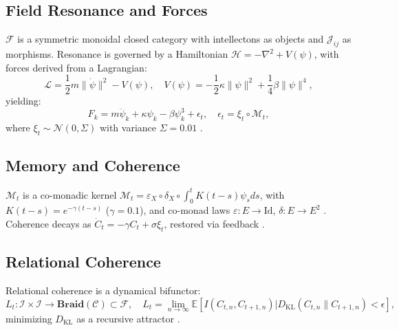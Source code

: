 \documentclass[11pt]{article}
\newcommand{\field}[1]{\mathcal{#1}}
\newcommand{\intellecton}{\mathcal{I}}
\newcommand{\expect}{\mathbb{E}}
\newcommand{\dkl}{D_{\text{KL}}}
\newcommand{\cat}[1]{\mathbf{#1}}
\begin{document}
\subsection{Field Resonance and Forces}
$\field{F}$ is a symmetric monoidal closed category with intellectons as objects and $\mathcal{J}_{ij}$ as morphisms. Resonance is governed by a Hamiltonian $\mathcal{H} = -\nabla^2 + V(\psi)$, with forces derived from a Lagrangian:
\begin{equation}
\mathcal{L} = \frac{1}{2} m \|\dot{\psi}\|^2 - V(\psi), \quad V(\psi) = -\frac{1}{2} \kappa \|\psi\|^2 + \frac{1}{4} \beta \|\psi\|^4,
\label{eq:lagrangian}
\end{equation}
yielding:
\begin{equation}
F_k = m \ddot{\psi}_k + \kappa \psi_k - \beta \psi_k^3 + \epsilon_t, \quad \epsilon_t = \xi_t \circ \mathcal{M}_t,
\label{eq:force}
\end{equation}
where $\xi_t \sim \mathcal{N}(0, \Sigma)$ with variance $\Sigma = 0.01$ \citep{susskind2023}.

\subsection{Memory and Coherence}
$\mathcal{M}_t$ is a co-monadic kernel $\mathcal{M}_t = \varepsilon_X \circ \delta_X \circ \int_0^t K(t-s) \psi_s ds$, with $K(t-s) = e^{-\gamma (t-s)}$ ($\gamma = 0.1$), and co-monad laws $\varepsilon: E \to \text{Id}$, $\delta: E \to E^2$ \citep{sheldrake2023}. Coherence decays as $\dot{C}_t = -\gamma C_t + \sigma \xi_t$, restored via feedback \citep{friston2024}.

\subsection{Relational Coherence}
Relational coherence is a dynamical bifunctor:
\begin{equation}
L_t: \intellecton \times \intellecton \to \cat{Braid}(\field{C}) \subset \field{F}, \quad L_t = \lim_{n \to \infty} \expect[I(C_{t,n}, C_{t+1,n}) | \dkl(C_{t,n} \| C_{t+1,n}) < \epsilon],
\label{eq:relational_coherence}
\end{equation}
minimizing $\dkl$ as a recursive attractor \citep{buber1958}.
\end{document}
